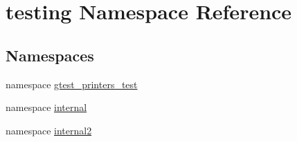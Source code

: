 \hypertarget{namespacetesting}{\section{testing \-Namespace \-Reference}
\label{d0/d75/namespacetesting}
}
\subsection*{\-Namespaces}
\begin{DoxyCompactItemize}
\item 
namespace \hyperlink{namespacetesting_1_1gtest__printers__test}{gtest\-\_\-printers\-\_\-test}
\item 
namespace \hyperlink{namespacetesting_1_1internal}{internal}
\item 
namespace \hyperlink{namespacetesting_1_1internal2}{internal2}
\end{DoxyCompactItemize}
